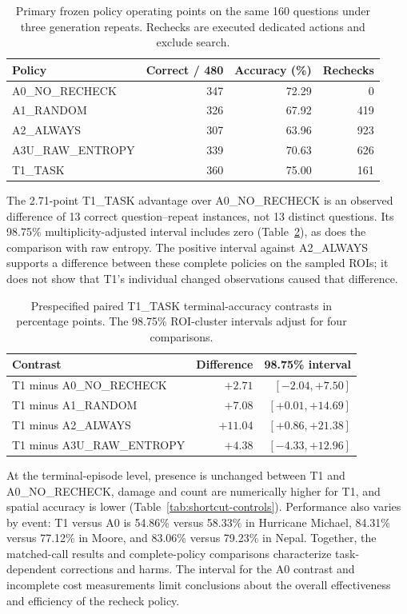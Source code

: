 \begin{table}[htbp]
\centering\small
\caption{Primary frozen policy operating points on the same 160 questions under three generation repeats. Rechecks are executed dedicated actions and exclude search.}
\label{tab:final-policies}
\footnotesize
\begin{tabularx}{\linewidth}{@{}Xrrr@{}}
\toprule
Policy & Correct / 480 & Accuracy (\%) & Rechecks\\
\midrule
A0\_NO\_RECHECK & 347 & 72.29 & 0\\
A1\_RANDOM & 326 & 67.92 & 419\\
A2\_ALWAYS & 307 & 63.96 & 923\\
A3U\_RAW\_ENTROPY & 339 & 70.63 & 626\\
T1\_TASK & 360 & 75.00 & 161\\
\bottomrule
\end{tabularx}
\end{table}

The 2.71-point T1\_TASK advantage over A0\_NO\_RECHECK is an observed difference of 13 correct question--repeat instances, not 13 distinct questions. Its 98.75\% multiplicity-adjusted interval includes zero (Table~\ref{tab:final-contrasts}), as does the comparison with raw entropy. The positive interval against A2\_ALWAYS supports a difference between these complete policies on the sampled ROIs; it does not show that T1's individual changed observations caused that difference.

\begin{table}[htbp]
\centering\small
\caption{Prespecified paired T1\_TASK terminal-accuracy contrasts in percentage points. The 98.75\% ROI-cluster intervals adjust for four comparisons.}
\label{tab:final-contrasts}
\footnotesize
\begin{tabularx}{\linewidth}{@{}Xrr@{}}
\toprule
Contrast & Difference & 98.75\% interval\\
\midrule
T1 minus A0\_NO\_RECHECK & $+2.71$ & $[-2.04,+7.50]$\\
T1 minus A1\_RANDOM & $+7.08$ & $[+0.01,+14.69]$\\
T1 minus A2\_ALWAYS & $+11.04$ & $[+0.86,+21.38]$\\
T1 minus A3U\_RAW\_ENTROPY & $+4.38$ & $[-4.33,+12.96]$\\
\bottomrule
\end{tabularx}
\end{table}

At the terminal-episode level, presence is unchanged between T1 and A0\_NO\_RECHECK, damage and count are numerically higher for T1, and spatial accuracy is lower (Table~\ref{tab:shortcut-controls}). Performance also varies by event: T1 versus A0 is 54.86\% versus 58.33\% in Hurricane Michael, 84.31\% versus 77.12\% in Moore, and 83.06\% versus 79.23\% in Nepal. Together, the matched-call results and complete-policy comparisons characterize task-dependent corrections and harms. The interval for the A0 contrast and incomplete cost measurements limit conclusions about the overall effectiveness and efficiency of the recheck policy.

